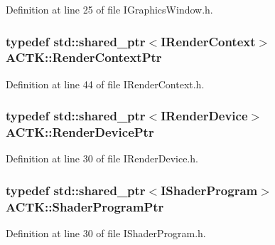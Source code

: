 Definition at line 25 of file I\-Graphics\-Window.\-h.

\hypertarget{namespace_a_c_t_k_a7030f603b6015e2f7c08ab1cc584d084}{
\subsubsection[{Render\-Context\-Ptr}]{\setlength{\rightskip}{0pt plus 5cm}typedef std\-::shared\-\_\-ptr$<${\bf I\-Render\-Context}$>$ {\bf A\-C\-T\-K\-::\-Render\-Context\-Ptr}}}\label{namespace_a_c_t_k_a7030f603b6015e2f7c08ab1cc584d084}


Definition at line 44 of file I\-Render\-Context.\-h.

\hypertarget{namespace_a_c_t_k_a456b9e135a6c2d4a753f35fe9b5ac009}{
\subsubsection[{Render\-Device\-Ptr}]{\setlength{\rightskip}{0pt plus 5cm}typedef std\-::shared\-\_\-ptr$<${\bf I\-Render\-Device}$>$ {\bf A\-C\-T\-K\-::\-Render\-Device\-Ptr}}}\label{namespace_a_c_t_k_a456b9e135a6c2d4a753f35fe9b5ac009}


Definition at line 30 of file I\-Render\-Device.\-h.

\hypertarget{namespace_a_c_t_k_a34512c71be222dc06a2906d6c00d2c4f}{
\subsubsection[{Shader\-Program\-Ptr}]{\setlength{\rightskip}{0pt plus 5cm}typedef std\-::shared\-\_\-ptr$<${\bf I\-Shader\-Program}$>$ {\bf A\-C\-T\-K\-::\-Shader\-Program\-Ptr}}}\label{namespace_a_c_t_k_a34512c71be222dc06a2906d6c00d2c4f}


Definition at line 30 of file I\-Shader\-Program.\-h.



